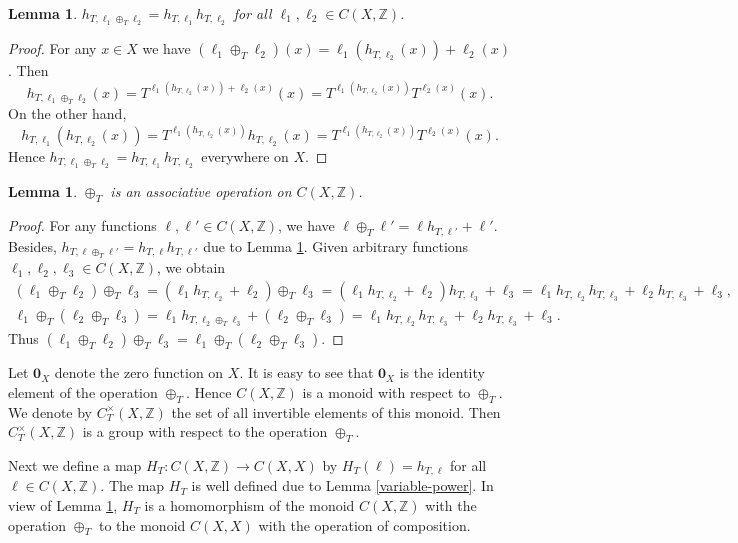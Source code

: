 \documentclass[12pt]{article}
\newtheorem{lemma}[theorem]{Lemma}
\theoremstyle{definition}
\def\bZ{\mathbb{Z}}
\def\0{\mathbf{0}}
\begin{document}
\begin{lemma}\label{h-composed}
$h_{T,\ell_1\oplus_T\ell_2}=h_{T,\ell_1}h_{T,\ell_2}$ for all 
$\ell_1,\ell_2\in C(X,\bZ)$.
\end{lemma}

\begin{proof}
For any $x\in X$ we have $(\ell_1\oplus_T\ell_2)(x)= 
\ell_1(h_{T,\ell_2}(x))+\ell_2(x)$.  Then
\[
h_{T,\ell_1\oplus_T\ell_2}(x)=T^{\ell_1(h_{T,\ell_2}(x))+\ell_2(x)}(x)
=T^{\ell_1(h_{T,\ell_2}(x))}T^{\ell_2(x)}(x).
\]
On the other hand,
\[
h_{T,\ell_1}(h_{T,\ell_2}(x))=T^{\ell_1(h_{T,\ell_2}(x))}h_{T,\ell_2}(x)
=T^{\ell_1(h_{T,\ell_2}(x))}T^{\ell_2(x)}(x).
\]
Hence $h_{T,\ell_1\oplus_T\ell_2}=h_{T,\ell_1}h_{T,\ell_2}$ everywhere on 
$X$.
\end{proof}

\begin{lemma}
$\oplus_T$ is an associative operation on $C(X,\bZ)$.
\end{lemma}

\begin{proof}
For any functions $\ell,\ell'\in C(X,\bZ)$, we have $\ell\oplus_T\ell'=\ell 
h_{T,\ell'}+\ell'$.  Besides, $h_{T,\ell\oplus_T\ell'}= 
h_{T,\ell}h_{T,\ell'}$ due to Lemma \ref{h-composed}.  Given arbitrary 
functions $\ell_1,\ell_2,\ell_3\in C(X,\bZ)$, we obtain
\begin{gather*}
(\ell_1\oplus_T\ell_2)\oplus_T\ell_3=
(\ell_1h_{T,\ell_2}+\ell_2)\oplus_T\ell_3=
(\ell_1h_{T,\ell_2}+\ell_2)h_{T,\ell_3}+\ell_3=
\ell_1h_{T,\ell_2}h_{T,\ell_3}+\ell_2h_{T,\ell_3}+\ell_3, \\
\ell_1\oplus_T(\ell_2\oplus_T\ell_3)=
\ell_1h_{T,\ell_2\oplus_T\ell_3}+(\ell_2\oplus_T\ell_3)=
\ell_1h_{T,\ell_2}h_{T,\ell_3}+\ell_2h_{T,\ell_3}+\ell_3.
\end{gather*}
Thus $(\ell_1\oplus_T\ell_2)\oplus_T\ell_3= 
\ell_1\oplus_T(\ell_2\oplus_T\ell_3)$.
\end{proof}

Let $\0_X$ denote the zero function on $X$.  It is easy to see that $\0_X$ 
is the identity element of the operation $\oplus_T$.  Hence $C(X,\bZ)$ is a 
monoid with respect to $\oplus_T$.  We denote by $C^\times_T(X,\bZ)$ the 
set of all invertible elements of this monoid.  Then $C^\times_T(X,\bZ)$ is 
a group with respect to the operation $\oplus_T$.

Next we define a map $H_T:C(X,\bZ)\to C(X,X)$ by $H_T(\ell)=h_{T,\ell}$ for 
all $\ell\in C(X,\bZ)$.  The map $H_T$ is well defined due to Lemma 
\ref{variable-power}.  In view of Lemma \ref{h-composed}, $H_T$ is a 
homomorphism of the monoid $C(X,\bZ)$ with the operation $\oplus_T$ to the 
monoid $C(X,X)$ with the operation of composition.
\end{document}
